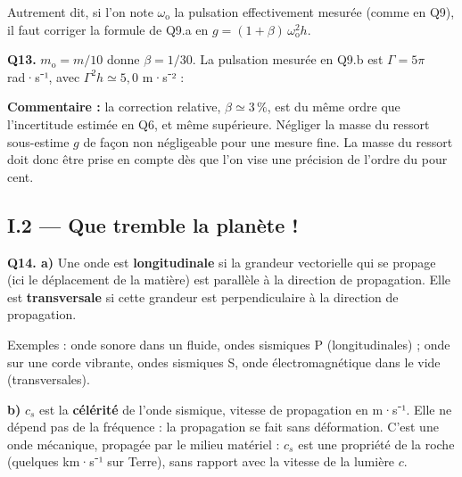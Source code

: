 \documentclass[11pt,a4paper]{article}
\newcommand{\equationajustee}[1]{%
  \sbox{\boiteequation}{$\displaystyle #1$}%
  \ifdim\wd\boiteequation>\linewidth
    \[\resizebox{\linewidth}{!}{\usebox{\boiteequation}}\]%
  \else
    \[#1\]%
  \fi}
\begin{document}
\equationajustee{\boxed{\begin{aligned}
g&=\omega_{\mathrm{o}}^2h\\
&=(1+\beta)\,\Gamma^2h
\end{aligned}}}

Autrement dit, si l'on note \(\omega_{\mathrm{o}}\) la pulsation effectivement mesurée (comme en Q9), il faut corriger la formule de Q9.a en \(g=(1+\beta)\,\omega_{\mathrm{o}}^2h\).

\textbf{Q13.} \(m_{\mathrm{o}}=m/10\) donne \(\beta=1/30\). La pulsation mesurée en Q9.b est \(\Gamma=5\pi\) rad·s⁻¹, avec \(\Gamma^2h\simeq5{,}0\) m·s⁻² :

\equationajustee{\begin{aligned}
g&=\left(1+\frac1{30}\right)\times5{,}0\\
&=\frac{31}{30}\times5{,}0
\end{aligned}}

\equationajustee{\boxed{g\simeq5{,}2\ \text{m·s}^{-2}}}

\textbf{Commentaire :} la correction relative, \(\beta\simeq3\,\%\), est du même ordre que l'incertitude estimée en Q6, et même supérieure. Négliger la masse du ressort sous-estime \(g\) de façon non négligeable pour une mesure fine. La masse du ressort doit donc être prise en compte dès que l'on vise une précision de l'ordre du pour cent.

\hypertarget{i.2-que-tremble-la-planuxe8te}{%
\subsection{I.2 --- Que tremble la planète !}\label{i.2-que-tremble-la-planuxe8te}}

\textbf{Q14. a)} Une onde est \textbf{longitudinale} si la grandeur vectorielle qui se propage (ici le déplacement de la matière) est parallèle à la direction de propagation. Elle est \textbf{transversale} si cette grandeur est perpendiculaire à la direction de propagation.

Exemples : onde sonore dans un fluide, ondes sismiques P (longitudinales) ; onde sur une corde vibrante, ondes sismiques S, onde électromagnétique dans le vide (transversales).

\textbf{b)} \(c_s\) est la \textbf{célérité} de l'onde sismique, vitesse de propagation en m·s⁻¹. Elle ne dépend pas de la fréquence : la propagation se fait sans déformation. C'est une onde mécanique, propagée par le milieu matériel : \(c_s\) est une propriété de la roche (quelques km·s⁻¹ sur Terre), sans rapport avec la vitesse de la lumière \(c\).
\end{document}
